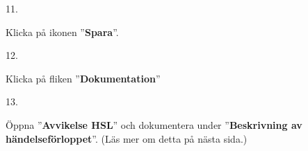 \documentclass[paper=a5,DIV=15,headinclude,twoside=semi,openany,titlepage=firstiscover]{scrbook}
\begin{document}
\noindent\hrulefill

\vfill
\noindent
\begin{minipage}[t]{0.06\textwidth}
	11.
\end{minipage}%
\begin{minipage}[t]{.44\textwidth}
	Klicka på ikonen ”\textbf{Spara}”.
\end{minipage}%
\begin{minipage}[t]{.5\textwidth}
	\hfill{}
\end{minipage}
\vfill

\noindent\hrulefill

\vfill
\noindent
\begin{minipage}[t]{0.06\textwidth}
	12.
\end{minipage}%
\begin{minipage}[t]{.44\textwidth}
	Klicka på fliken ”\textbf{Dokumentation}”
\end{minipage}%
\begin{minipage}[t]{.5\textwidth}
	\hfill{}
\end{minipage}
\vfill

\noindent\hrulefill

\vfill
\noindent
\begin{minipage}[t]{0.06\textwidth}
	13.
\end{minipage}%
\begin{minipage}[t]{.45\textwidth}
	Öppna ”\textbf{Avvikelse HSL}” och dokumentera under ”\textbf{Beskrivning av händelseförloppet}”. (Läs mer om detta på nästa sida.)
\end{minipage}%
\begin{minipage}[t]{.49\textwidth}
	\hfill{}
\end{minipage}
\vfill
\end{document}
